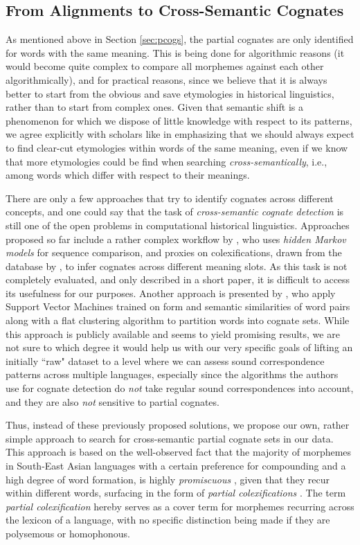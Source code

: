 \documentclass[xetex,svgnames]{scrartcl}
\begin{document}
\subsection{From Alignments to Cross-Semantic Cognates}
As mentioned above in Section \ref{sec:pcogs}, the partial cognates are only identified for words
with the same meaning. This is being done for algorithmic reasons (it would become quite complex to
compare all morphemes against each other algorithmically), and for practical reasons, since we
believe that it is always better to start from the obvious and save etymologies in historical
linguistics, rather than to start from complex ones. Given that semantic shift is a phenomenon for
which we dispose of little knowledge with respect to its patterns, we agree explicitly with scholars
like \citet{Dybo2008} in emphasizing that we should always expect to find clear-cut etymologies
within words of the same meaning, even if we know that more etymologies could be find when searching
\emph{cross-semantically}, i.e., among words which differ with respect to their meanings.
 
There are only a few approaches that try to identify cognates across different concepts, and one
could say that the task of \emph{cross-semantic cognate detection} is still one of the open problems
in computational historical linguistics. Approaches proposed so far include a rather complex
workflow by \citet{Wahle2016}, who uses \emph{hidden Markov models} for sequence comparison, and
proxies on colexifications, drawn from the database by \citet{Dellert2017}, to infer cognates across
different meaning slots. As this task is not completely evaluated, and only described in a short
paper, it is difficult to access its usefulness for our purposes. Another approach is presented by
\citet{Arnaud2017}, who apply Support Vector Machines trained on form and semantic similarities of
word pairs along with a flat clustering algorithm to partition words into cognate sets. 
While this approach is publicly available and seems to yield promising results, we are not sure to
which degree it would help us with our very specific goals of lifting an initially ``raw" dataset
to a level where we can assess sound correspondence patterns across multiple languages, especially
since the algorithms the authors use for cognate detection do \emph{not} take regular sound
correspondences into account, and they are also \emph{not} sensitive to partial cognates.
 
Thus, instead of these previously proposed solutions, we propose our own, rather simple approach to
search for cross-semantic partial cognate sets in our data. This approach is based on the
well-observed fact that the majority of morphemes in South-East Asian languages with a certain
preference for compounding and a high degree of word formation, is highly \emph{promiscuous}
\citep[8f]{List2016h}, given
that they recur within different words, surfacing in the form of \emph{partial colexifications}
\citep[62]{Hill2017a}. The term \emph{partial colexification} hereby serves as a cover term for
morphemes recurring across the lexicon of a language, with no specific distinction being made if
they are polysemous or homophonous. 
 
\end{document}
